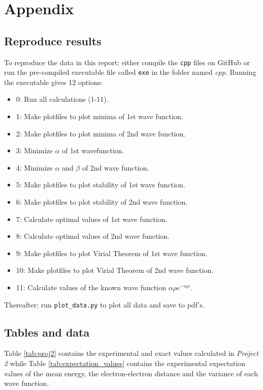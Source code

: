 \documentclass[12pt,english,a4paper]{article}
\begin{document}
\section{Appendix} \label{section:appendix}
\subsection{Reproduce results} \label{section:appendix:reproduce}
To reproduce the data in this report; either compile the \texttt{cpp} files on GitHub or run the pre-compiled executable file called \texttt{exe} in the folder named \textit{cpp}. Running the executable gives 12 options:

\begin{itemize}
    \renewcommand\labelitemi{--}
    \item 0: Run all calculations (1-11).
    \item 1: Make plotfiles to plot minima of 1st wave function.
    \item 2: Make plotfiles to plot minima of 2nd wave function.
    \item 3: Minimize $\alpha$ of 1st wavefunction.
    \item 4: Minimize $\alpha$ and $\beta$ of 2nd wave function.
    \item 5: Make plotfiles to plot stability of 1st wave function.
    \item 6: Make plotfiles to plot stability of 2nd wave function.
    \item 7: Calculate optimal values of 1st wave function.
    \item 8: Calculate optimal values of 2nd wave function.
    \item 9: Make plotfiles to plot Virial Theorem of 1st wave function.
    \item 10: Make plotfiles to plot Virial Theorem of 2nd wave function.
    \item 11: Calculate values of the known wave function $\alpha\rho e^{-\alpha\rho}$.
\end{itemize}

Thereafter; run \texttt{plot\_data.py} to plot all data and save to pdf's.

\subsection{Tables and data} \label{section:appendix:tables}

Table \ref{tab:proj2} contains the experimental and exact values calculated in \textit{Project 2} while Table \ref{tab:expectation_values} contains the experimental expectation values of the mean energy, the electron-electron distance and the variance of each wave function. 
\end{document}
